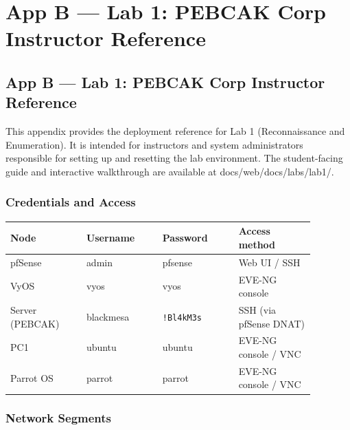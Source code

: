 \chapter{App B --- Lab 1: PEBCAK Corp Instructor Reference}

\section{App B --- Lab 1: PEBCAK Corp Instructor Reference}

This appendix provides the deployment reference for Lab 1 (Reconnaissance and Enumeration). It is intended for instructors and system administrators responsible for setting up and resetting the lab environment. The student-facing guide and interactive walkthrough are available at docs/web/docs/labs/lab1/.

\subsection{Credentials and Access}

{\footnotesize\begin{longtable}[]{@{}>{\raggedright\arraybackslash}p{0.22\linewidth}
  >{\raggedright\arraybackslash}p{0.22\linewidth}
  >{\raggedright\arraybackslash}p{0.22\linewidth}
  >{\raggedright\arraybackslash}p{0.22\linewidth}@{}}
\toprule\noalign{}
\textbf{Node} & \textbf{Username} & \textbf{Password} & \textbf{Access method} \\
\midrule\noalign{}
\endhead
\bottomrule\noalign{}
\endlastfoot
pfSense & admin & pfsense & Web UI / SSH \\
VyOS & vyos & vyos & EVE-NG console \\
Server (PEBCAK) & blackmesa & \texttt{!Bl4kM3s} & SSH (via pfSense DNAT) \\
PC1 & ubuntu & ubuntu & EVE-NG console / VNC \\
Parrot OS & parrot & parrot & EVE-NG console / VNC \\
\end{longtable}}

\subsection{Network Segments}

